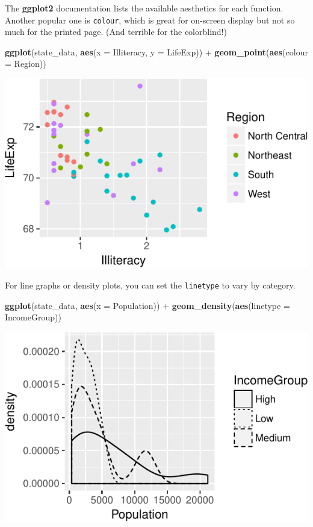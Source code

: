 \documentclass[12pt,oneside,openany]{tufte-book}
\newenvironment{Shaded}{}{}
\newcommand{\KeywordTok}[1]{\textcolor[rgb]{0.00,0.44,0.13}{\textbf{{#1}}}}
\newcommand{\DataTypeTok}[1]{\textcolor[rgb]{0.56,0.13,0.00}{{#1}}}
\newcommand{\StringTok}[1]{\textcolor[rgb]{0.25,0.44,0.63}{{#1}}}
\newcommand{\NormalTok}[1]{{#1}}
\begin{document}
The \textbf{ggplot2} documentation lists the available aesthetics for
each function. Another popular one is \texttt{colour}, which is great
for on-screen display but not so much for the printed page. (And
terrible for the colorblind!)

\begin{Shaded}
\begin{Highlighting}[]
\KeywordTok{ggplot}\NormalTok{(state_data, }\KeywordTok{aes}\NormalTok{(}\DataTypeTok{x =} \NormalTok{Illiteracy, }\DataTypeTok{y =} \NormalTok{LifeExp)) +}\StringTok{ }
\StringTok{    }\KeywordTok{geom_point}\NormalTok{(}\KeywordTok{aes}\NormalTok{(}\DataTypeTok{colour =} \NormalTok{Region))}
\end{Highlighting}
\end{Shaded}

\includegraphics{pdaps_files/figure-latex/aes-colour-1}

For line graphs or density plots, you can set the \texttt{linetype} to
vary by category.

\begin{Shaded}
\begin{Highlighting}[]
\KeywordTok{ggplot}\NormalTok{(state_data, }\KeywordTok{aes}\NormalTok{(}\DataTypeTok{x =} \NormalTok{Population)) +}\StringTok{ }\KeywordTok{geom_density}\NormalTok{(}\KeywordTok{aes}\NormalTok{(}\DataTypeTok{linetype =} \NormalTok{IncomeGroup))}
\end{Highlighting}
\end{Shaded}

\includegraphics{pdaps_files/figure-latex/aes-linetype-1}
\end{document}
